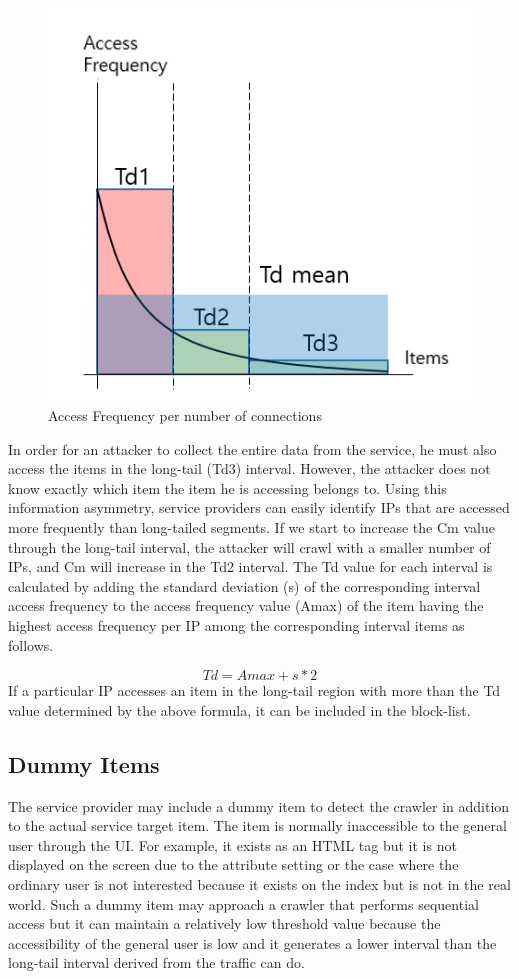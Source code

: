 \documentclass[sigconf,anonymous=false]{acmart}
\begin{document}
\begin{figure}[H]
    \includegraphics[width=0.7\columnwidth]{figs/figure_01.png}
    \caption{Access Frequency per number of connections}
    \label{fig:my_label}
\end{figure}

In order for an attacker to collect the entire data from the service, he must also access the items in the long-tail (Td3) interval. However, the attacker does not know exactly which item the item he is accessing belongs to. Using this information asymmetry, service providers can easily identify IPs that are accessed more frequently than long-tailed segments. If we start to increase the Cm value through the long-tail interval, the attacker will crawl with a smaller number of IPs, and Cm will increase in the Td2 interval.
The Td value for each interval is calculated by adding the standard deviation (s) of the corresponding interval access frequency to the access frequency value (Amax) of the item having the highest access frequency per IP among the corresponding interval items as follows. 

  \begin{displaymath}
    Td = Amax + s * 2
  \end{displaymath}\newline
If a particular IP accesses an item in the long-tail region with more than the Td value determined by the above formula, it can be included in the block-list.

\subsection{Dummy Items}
The service provider may include a dummy item to detect the crawler in addition to the actual service target item. The item is normally inaccessible to the general user through the UI. For example, it exists as an HTML tag but it is not displayed on the screen due to the attribute setting or the case where the ordinary user is not interested because it exists on the index but is not in the real world.
Such a dummy item may approach a crawler that performs sequential access but it can maintain a relatively low threshold value because the accessibility of the general user is low and it generates a lower interval than the long-tail interval derived from the traffic can do.
\end{document}
